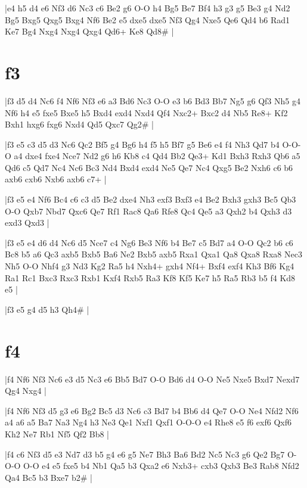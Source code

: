 \whitename{}
\blackname{}
\makegametitle
|e4 h5 d4 e6 Nf3 d6 Nc3 c6 Be2 g6 O-O h4 Bg5 Be7 Bf4 h3 g3 g5 Be3 g4 Nd2 Bg5 Bxg5 Qxg5 Bxg4 Nf6 Be2 e5 dxe5 dxe5 Nf3 Qg4 Nxe5 Qe6 Qd4 b6 Rad1 Ke7 Bg4 Nxg4 Nxg4 Qxg4 Qd6+ Ke8 Qd8\#  |

\section{f3}

\whitename{}
\blackname{}
\makegametitle
|f3 d5 d4 Nc6 f4 Nf6 Nf3 e6 a3 Bd6 Nc3 O-O e3 b6 Bd3 Bb7 Ng5 g6 Qf3 Nh5 g4 Nf6 h4 e5 fxe5 Bxe5 h5 Bxd4 exd4 Nxd4 Qf4 Nxc2+ Bxc2 d4 Nb5 Re8+ Kf2 Bxh1 hxg6 fxg6 Nxd4 Qd5 Qxc7 Qg2\#  |

\whitename{}
\blackname{}
\makegametitle
|f3 e5 c3 d5 d3 Nc6 Qc2 Bf5 g4 Bg6 h4 f5 h5 Bf7 g5 Be6 e4 f4 Nh3 Qd7 b4 O-O-O a4 dxe4 fxe4 Nce7 Nd2 g6 h6 Kb8 c4 Qd4 Bb2 Qe3+ Kd1 Bxh3 Rxh3 Qb6 a5 Qd6 c5 Qd7 Nc4 Nc6 Bc3 Nd4 Bxd4 exd4 Ne5 Qe7 Nc4 Qxg5 Be2 Nxh6 c6 b6 axb6 cxb6 Nxb6 axb6 c7+  |

\whitename{}
\blackname{}
\makegametitle
|f3 e5 e4 Nf6 Bc4 c6 c3 d5 Be2 dxe4 Nh3 exf3 Bxf3 e4 Be2 Bxh3 gxh3 Bc5 Qb3 O-O Qxb7 Nbd7 Qxc6 Qe7 Rf1 Rac8 Qa6 Rfe8 Qc4 Qe5 a3 Qxh2 b4 Qxh3 d3 exd3 Qxd3  |

\whitename{}
\blackname{}
\makegametitle
|f3 e5 e4 d6 d4 Nc6 d5 Nce7 c4 Ng6 Be3 Nf6 b4 Be7 c5 Bd7 a4 O-O Qc2 b6 c6 Bc8 b5 a6 Qc3 axb5 Bxb5 Ba6 Ne2 Bxb5 axb5 Rxa1 Qxa1 Qa8 Qxa8 Rxa8 Nec3 Nh5 O-O Nhf4 g3 Nd3 Kg2 Ra5 h4 Nxh4+ gxh4 Nf4+ Bxf4 exf4 Kh3 Bf6 Kg4 Ra1 Rc1 Bxc3 Rxc3 Rxb1 Kxf4 Rxb5 Ra3 Kf8 Kf5 Ke7 h5 Ra5 Rb3 b5 f4 Kd8 e5  |

\whitename{}
\blackname{}
\makegametitle
|f3 e5 g4 d5 h3 Qh4\#  |


\section{f4}

\whitename{}
\blackname{}
\makegametitle
|f4 Nf6 Nf3 Nc6 e3 d5 Nc3 e6 Bb5 Bd7 O-O Bd6 d4 O-O Ne5 Nxe5 Bxd7 Nexd7 Qg4 Nxg4  |

\whitename{}
\blackname{}
\makegametitle
|f4 Nf6 Nf3 d5 g3 e6 Bg2 Bc5 d3 Nc6 c3 Bd7 b4 Bb6 d4 Qe7 O-O Ne4 Nfd2 Nf6 a4 a6 a5 Ba7 Na3 Ng4 h3 Ne3 Qe1 Nxf1 Qxf1 O-O-O e4 Rhe8 e5 f6 exf6 Qxf6 Kh2 Ne7 Rb1 Nf5 Qf2 Bb8  |

\whitename{}
\blackname{}
\makegametitle
|f4 c6 Nf3 d5 e3 Nd7 d3 b5 g4 e6 g5 Ne7 Bh3 Ba6 Bd2 Nc5 Nc3 g6 Qe2 Bg7 O-O-O O-O e4 e5 fxe5 b4 Nb1 Qa5 b3 Qxa2 e6 Nxb3+ cxb3 Qxb3 Be3 Rab8 Nfd2 Qa4 Bc5 b3 Bxe7 b2\#  |


